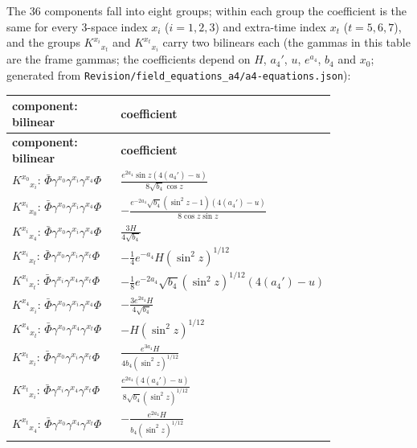 \documentclass[11pt]{article}
\begin{document}
The 36 components fall into eight groups; within each group the coefficient is the same for every 3-space index $x_i$ ($i = 1, 2, 3$) and extra-time index $x_t$ ($t = 5, 6, 7$), and the groups $K^{x_i}{}_{x_t}$ and $K^{x_t}{}_{x_i}$ carry two bilinears each (the gammas in this table are the frame gammas; the coefficients depend on $H$, $a_4'$, $u$, $e^{a_4}$, $b_4$ and $x_0$; generated from \texttt{Revision\allowbreak{}/field\_e\allowbreak{}quations\allowbreak{}\_a4/a4-e\allowbreak{}quations\allowbreak{}.json}):

\begingroup
\small
\begin{longtable}{@{}>{\raggedright\arraybackslash}p{0.400\linewidth}>{\raggedright\arraybackslash}p{0.400\linewidth}@{}}
\toprule
\textbf{component: bilinear} & \textbf{coefficient} \\
\midrule
\endfirsthead
\toprule
\textbf{component: bilinear} & \textbf{coefficient} \\
\midrule
\endhead
$K^{x_0}{}_{x_i}$: $\bar\Phi \gamma^{x_0} \gamma^{x_i} \gamma^{x_4} \Phi$ & $\frac{e^{2 a_4} \sin z (4 (a_4')-u)}{8 \sqrt{b_4} \cos z}$ \\
$K^{x_i}{}_{x_0}$: $\bar\Phi \gamma^{x_0} \gamma^{x_i} \gamma^{x_4} \Phi$ & $-\frac{e^{-2 a_4} \sqrt{b_4} \left(\sin^2 z-1\right) (4 (a_4')-u)}{8 \cos z \sin z}$ \\
$K^{x_i}{}_{x_4}$: $\bar\Phi \gamma^{x_0} \gamma^{x_i} \gamma^{x_4} \Phi$ & $\frac{3 H}{4 \sqrt{b_4}}$ \\
$K^{x_i}{}_{x_t}$: $\bar\Phi \gamma^{x_0} \gamma^{x_i} \gamma^{x_t} \Phi$ & $-\frac{1}{4} e^{-a_4} H (\sin^2 z)^{1/12}$ \\
$K^{x_i}{}_{x_t}$: $\bar\Phi \gamma^{x_i} \gamma^{x_4} \gamma^{x_t} \Phi$ & $-\frac{1}{8} e^{-2 a_4} \sqrt{b_4} (\sin^2 z)^{1/12} (4 (a_4')-u)$ \\
$K^{x_4}{}_{x_i}$: $\bar\Phi \gamma^{x_0} \gamma^{x_i} \gamma^{x_4} \Phi$ & $-\frac{3 e^{2 a_4} H}{4 \sqrt{b_4}}$ \\
$K^{x_4}{}_{x_t}$: $\bar\Phi \gamma^{x_0} \gamma^{x_4} \gamma^{x_t} \Phi$ & $-H (\sin^2 z)^{1/12}$ \\
$K^{x_t}{}_{x_i}$: $\bar\Phi \gamma^{x_0} \gamma^{x_i} \gamma^{x_t} \Phi$ & $\frac{e^{3 a_4} H}{4 b_4 (\sin^2 z)^{1/12}}$ \\
$K^{x_t}{}_{x_i}$: $\bar\Phi \gamma^{x_i} \gamma^{x_4} \gamma^{x_t} \Phi$ & $\frac{e^{2 a_4} (4 (a_4')-u)}{8 \sqrt{b_4} (\sin^2 z)^{1/12}}$ \\
$K^{x_t}{}_{x_4}$: $\bar\Phi \gamma^{x_0} \gamma^{x_4} \gamma^{x_t} \Phi$ & $-\frac{e^{2 a_4} H}{b_4 (\sin^2 z)^{1/12}}$ \\
\bottomrule
\end{longtable}
\endgroup
\end{document}
